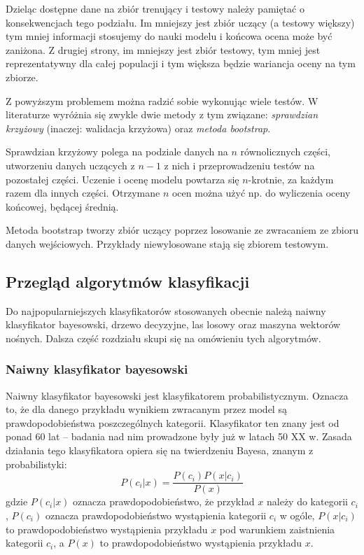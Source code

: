 \documentclass[../thesis.tex]{subfiles}
\begin{document}
Dzieląc dostępne dane na zbiór trenujący i testowy należy pamiętać o konsekwencjach tego podziału. Im mniejszy jest zbiór uczący (a testowy większy) tym mniej informacji stosujemy do nauki modelu i końcowa ocena może być zaniżona. Z drugiej strony, im mniejszy jest zbiór testowy, tym mniej jest reprezentatywny dla całej populacji i tym większa będzie wariancja oceny na tym zbiorze. 

Z  powyższym problemem można radzić sobie wykonując wiele testów. W literaturze wyróżnia się zwykle dwie metody z tym związane: \emph{sprawdzian krzyżowy} (inaczej: walidacja krzyżowa) oraz \emph{metoda bootstrap}.

Sprawdzian krzyżowy polega na podziale danych na $n$ równolicznych części, utworzeniu danych uczących z $n-1$ z nich i przeprowadzeniu testów na pozostałej części. Uczenie i ocenę modelu powtarza się $n$-krotnie, za każdym razem dla innych części. Otrzymane $n$ ocen można użyć np. do wyliczenia oceny końcowej, będącej średnią. 

Metoda bootstrap tworzy zbiór uczący poprzez losowanie ze zwracaniem ze zbioru danych wejściowych. Przykłady niewylosowane stają się zbiorem testowym.

\subsection{Przegląd algorytmów klasyfikacji}

Do najpopularniejszych klasyfikatorów stosowanych obecnie należą naiwny klasyfikator bayesowski, drzewo decyzyjne, las losowy oraz maszyna wektorów nośnych. Dalsza część rozdziału skupi się na omówieniu tych algorytmów.

\subsubsection{Naiwny klasyfikator bayesowski}

Naiwny klasyfikator bayesowski jest klasyfikatorem probabilistycznym. Oznacza to, że dla danego przykładu wynikiem zwracanym przez model są prawdopodobieństwa poszczególnych kategorii. Klasyfikator ten znany jest od ponad 60 lat – badania nad nim prowadzone były już w latach 50 XX w. Zasada działania tego klasyfikatora opiera się na twierdzeniu Bayesa, znanym z probabilistyki:
\[P(c_i|x) = \frac{P(c_i)P(x|c_i)}{P(x)}\]
gdzie $P(c_i|x)$ oznacza prawdopodobieństwo, że przykład $x$ należy do kategorii $c_i$, $P(c_i)$ oznacza prawdopodobieństwo wystąpienia kategorii $c_i$ w ogóle, $P(x|c_i)$ to prawdopodobieństwo wystąpienia przykładu $x$ pod warunkiem zaistnienia kategorii $c_i$, a $P(x)$ to prawdopodobieństwo wystąpienia przykładu $x$.
\end{document}
